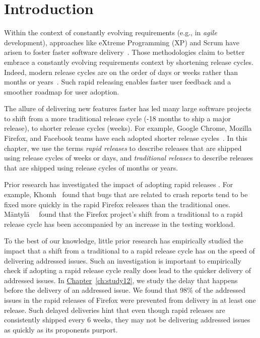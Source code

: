 \section{Introduction} \label{sec:introduction}

Within the context of constantly evolving requirements (e.g., in \textit{agile}
development), approaches like eXtreme Programming (XP) and Scrum have arisen to
foster faster software
delivery~\cite{beck2000extreme}.
Those methodologies claim to better embrace a constantly evolving requirements
context by shortening release cycles. Indeed, modern release cycles are on the
order of days or weeks rather than months or years~\cite{baskerville2004short}.
Such rapid releasing enables faster user feedback and a smoother roadmap for
user adoption.

The allure of delivering new features faster has led many large software
projects to shift from a more traditional release cycle (-18 months to
ship a major release), to shorter release cycles (\eg weeks). For example,
Google Chrome, Mozilla Firefox, and Facebook teams have each adopted shorter release
cycles~\cite{adams2016saner}. In this chapter, we use the terms \textit{rapid releases} to describe
releases that are shipped using release cycles of weeks or days, and \textit{traditional
releases} to describe releases that are shipped using release cycles of months or years. 

Prior research has investigated the impact of adopting rapid
releases \cite{mantyla2014rapid,souza2014rapid,souzabackout,baysal2011tale,khomh2012faster}.
For example, Khomh~\etal \cite{khomh2012faster} found that bugs that are related to crash
reports tend to be fixed more quickly in the rapid Firefox releases than the traditional
ones. M\"antyl\"a~\etal~\cite{mantyla2014rapid} found that the
Firefox project's shift from a traditional to a rapid release cycle has been
accompanied by an increase in the testing workload.
 
To the best of our knowledge, little prior research has empirically studied the
impact that a shift from a traditional to a rapid release cycle has on the speed
of delivering addressed issues. Such an investigation is important to
empirically check if adopting a rapid release cycle really does lead to the
quicker delivery of addressed issues. In
\hyperref[ch:study12]{Chapter}~\ref{ch:study12}, we study the delay that
happens before the delivery of an addressed issue. We found that 98\% of the
addressed issues in the rapid releases of Firefox were prevented from delivery
in at least one release. Such delayed deliveries hint that even though rapid
releases are consistently shipped every 6 weeks, they may not be delivering
addressed issues as quickly as its proponents purport.

